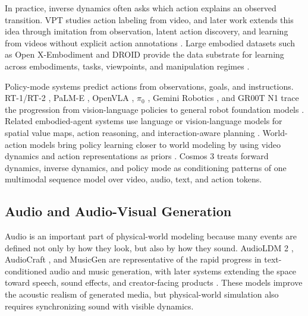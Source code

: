In practice, inverse dynamics often asks which action explains an observed transition.
VPT \citep{baker2022vpt} studies action labeling from video, and later work extends this idea through imitation from observation, latent action discovery, and learning from videos without explicit action annotations \citep{zhang2022learningdrive,torabi2018bco,yang2019iddm,pavse2019ridm,schmidt2023lapo,ye2024latentaction,latent_action_wild}.
Large embodied datasets such as Open X-Embodiment \citep{vuong2023open} and DROID \citep{khazatsky2024droid} provide the data substrate for learning across embodiments, tasks, viewpoints, and manipulation regimes \citep{walke2023bridgedata,liu2023libero,nasiriany2024robocasa,contributors2024agibotworldrepo,bu2025agibot,grauman2024egoexo4d,li2023behavior1k}.

Policy-mode systems predict actions from observations, goals, and instructions.
RT-1/RT-2 \citep{brohan2022rt,brohan2023rt}, PaLM-E \citep{driess2023palme}, OpenVLA \citep{kim2024openvla}, $\pi_0$ \citep{black2024pi0}, Gemini Robotics \citep{gemini2025robotics,gemini_robotics15}, and GR00T N1 \citep{bjorck2025gr00t} trace the progression from vision-language policies to general robot foundation models \citep{roboflamingo,octo2024,pi05,liu2024rdt,zhou2025chatvla,zheng2026xvla,yang2025egovla,shi2025hi,lee2025molmoact,gr1,gr2}.
Related embodied-agent systems use language or vision-language models for spatial value maps, action reasoning, and interaction-aware planning \citep{voxposer,zawalski2024ecot,yang2025magma}.
World-action models bring policy learning closer to world modeling by using video dynamics and action representations as priors \citep{li2025uva,ye2026dreamzero,univla,rynnvla,world_action_survey,acwmphys}.
Cosmos 3 treats forward dynamics, inverse dynamics, and policy mode as conditioning patterns of one multimodal sequence model over video, audio, text, and action tokens.

\subsection{Audio and Audio-Visual Generation}
Audio is an important part of physical-world modeling because many events are defined not only by how they look, but also by how they sound.
AudioLDM 2 \citep{audioldm2}, AudioCraft \citep{audiocraft}, and MusicGen \citep{musicgen} are representative of the rapid progress in text-conditioned audio and music generation, with later systems extending the space toward speech, sound effects, and creator-facing products \citep{voicebox,audiobox,stableaudioopen,lee2024etta,suno,udio,elevenlabs_sfx}.
These models improve the acoustic realism of generated media, but physical-world simulation also requires synchronizing sound with visible dynamics.

